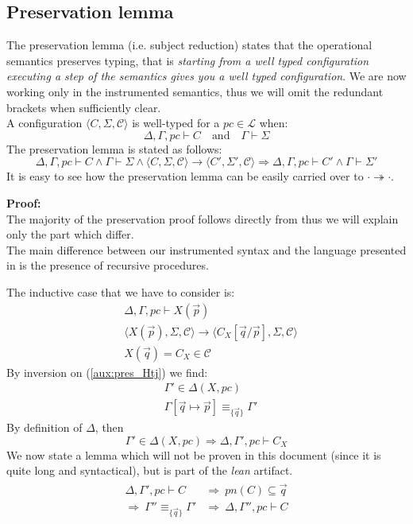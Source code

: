\documentclass[12pt,a4paper,twoside]{book}
\newcommand{\MCL}{\mathscr{L}}
\begin{document}
\subsection{Preservation lemma}
The preservation lemma (i.e. subject reduction) states that the operational semantics preserves typing, that is \emph{starting from a well typed configuration executing a step of the semantics gives you a well typed configuration}.
We are now working only in the instrumented semantics, thus we will omit the redundant brackets when sufficiently clear.\\
A configuration
$\langle C, \Sigma, \mathscr{C}\rangle$ is well-typed for a $pc \in \MCL$ when:
$$\Delta, \Gamma, pc \vdash C \quad \text{and}\quad \Gamma \vdash \Sigma$$
The preservation lemma is stated as follows:
\begin{equation}\label{aux:pres}
\Delta, \Gamma, pc \vdash C \land \Gamma \vdash \Sigma \land 
\langle C, \Sigma, \mathscr{C}\rangle \rightarrow
\langle C', \Sigma', \mathscr{C}\rangle \Rightarrow 
\Delta, \Gamma, pc \vdash C' \land \Gamma \vdash \Sigma'
\end{equation}
It is easy to see how the preservation lemma can be easily carried over to $\cdot \twoheadrightarrow \cdot$.

\medskip
\noindent\textbf{Proof:}\\
The majority of the preservation proof follows directly from \cite{myers2011proving} thus we will explain only the part which differ.\\
The main difference between our instrumented syntax and the language presented in \cite{myers2011proving} is the presence of recursive procedures.

The inductive case that we have to consider is:
\begin{align}
	&\Delta,\Gamma,pc \vdash X(\vec{p})\label{aux:pres_Htj}\tag{H1}\\
	&\langle X(\vec{p}), \Sigma, \mathscr{C}\rangle \rightarrow
	\langle C_X[\vec{q}/\vec{p}], \Sigma, \mathscr{C}\rangle\label{aux:pres_Hlto}\tag{H2}\\
	&X(\vec{q}) = C_X \in \mathscr{C}\label{aux:pres_Hlook}\tag{H3}
\end{align}
By inversion on (\ref{aux:pres_Htj}) we find:
\begin{align}
	&\Gamma' \in \Delta(X,pc) \label{aux:pres_Htj1}\tag{H11}\\
	&\Gamma[\vec{q}\mapsto \vec{p}] \equiv_{\{\vec{q}\}} \Gamma'\label{aux:pres_Htj2}\tag{H12}
\end{align}
By definition of $\Delta$, then
$$
\Gamma' \in \Delta(X,pc) \Rightarrow \Delta, \Gamma', pc \vdash C_X
$$
We now state a lemma which will not be proven in this document (since it is quite long and syntactical), but is part of the \emph{lean} artifact.
\begin{align*}\label{aux:pres_lemma2}
\begin{split}
	\Delta, \Gamma', pc \vdash C 
	&\Rightarrow~ pn(C) \subseteq \vec{q}\\
	\Rightarrow~ \Gamma'' \equiv_{\{\vec{q}\}} \Gamma'
	&\Rightarrow~ \Delta, \Gamma'', pc \vdash C
\end{split}
\end{align*}
\end{document}
